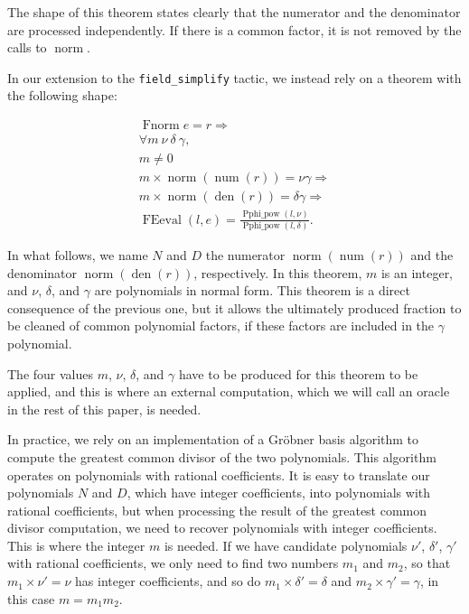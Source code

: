 \documentclass{jflart}
\begin{document}
The shape of this theorem states clearly that the numerator and the
denominator are processed independently.  If there is a common factor,
it is not removed by the calls to \(\operatorname{norm}\).

\label{sec:extension-lemma}
In our extension to the \texttt{field\_simplify} tactic, we instead rely on a
theorem with the following shape:

\[
\begin{array}{l}
 \operatorname{Fnorm} e = r \Longrightarrow\\
  \forall m~\nu~\delta~\gamma,\\
  m \neq 0 \\

  m \times \operatorname{norm}(\operatorname{num}(r)) = \nu\gamma \Longrightarrow\\
  m \times \operatorname{norm}(\operatorname{den}(r))= \delta\gamma \Longrightarrow\\
  \operatorname{FEeval}(l,e)=
  \frac{\displaystyle{\operatorname{Pphi\_pow}(l, \nu)}}
       {\displaystyle{\operatorname{Pphi\_pow}(l, \delta)}}.
\end{array}
\]

In what follows, we name \(N\) and \(D\) the numerator
\(\operatorname{norm}(\operatorname{num}(r))\) and the denominator \break
\(\operatorname{norm}(\operatorname{den}(r))\), respectively.  In this theorem, \(m\)
is an integer, and \(\nu\), \(\delta\), and \(\gamma\) are polynomials
in normal form.  This theorem is a direct consequence of the previous one, but it allows the ultimately produced fraction to be cleaned of common polynomial factors,
if these factors are included in the \(\gamma\) polynomial.

The four values \(m\), \(\nu\), \(\delta\), and \(\gamma\) have to be produced for
this theorem to be applied, and this is where an external
computation, which we will call an oracle in the rest of this paper, is needed.

In practice, we rely on an implementation of a Gröbner basis algorithm to
compute the greatest common divisor of the two polynomials.  This algorithm
operates on polynomials with rational coefficients.  It is easy to translate
our polynomials \(N\) and \(D\), which have integer coefficients, into polynomials
with rational coefficients, but when processing the result of the greatest
common divisor computation, we need to recover polynomials with integer
coefficients.  This is where the integer \(m\) is needed.  If we have candidate
polynomials \(\nu'\), \(\delta'\), \(\gamma'\) with rational coefficients, we only need to find two numbers
\(m_1\) and \(m_2\), so that \(m_1 \times \nu' = \nu\) has integer coefficients, and
so do \(m_1 \times \delta' = \delta \) and \(m_2 \times \gamma' = \gamma\), in this
case \(m=m_1 m_2\).
\end{document}
